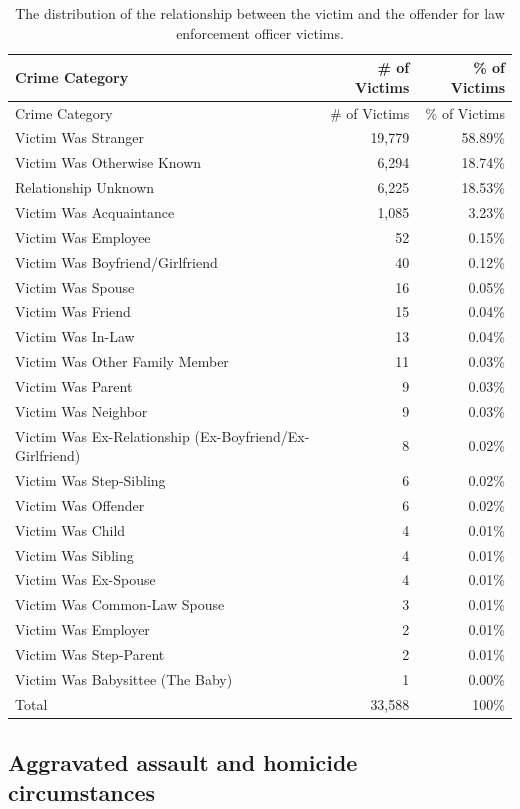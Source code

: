 \documentclass[
  12pt,
  openany]{book}
\begin{document}
\begin{longtable}[]{@{}lrr@{}}
\caption{\label{tab:victimRelationshipPolice}The distribution of the relationship between the victim and the offender for law enforcement officer victims.}\tabularnewline
\toprule
Crime Category & \# of Victims & \% of Victims\tabularnewline
\midrule
\endfirsthead
\toprule
Crime Category & \# of Victims & \% of Victims\tabularnewline
\midrule
\endhead
Victim Was Stranger & 19,779 & 58.89\%\tabularnewline
Victim Was Otherwise Known & 6,294 & 18.74\%\tabularnewline
Relationship Unknown & 6,225 & 18.53\%\tabularnewline
Victim Was Acquaintance & 1,085 & 3.23\%\tabularnewline
Victim Was Employee & 52 & 0.15\%\tabularnewline
Victim Was Boyfriend/Girlfriend & 40 & 0.12\%\tabularnewline
Victim Was Spouse & 16 & 0.05\%\tabularnewline
Victim Was Friend & 15 & 0.04\%\tabularnewline
Victim Was In-Law & 13 & 0.04\%\tabularnewline
Victim Was Other Family Member & 11 & 0.03\%\tabularnewline
Victim Was Parent & 9 & 0.03\%\tabularnewline
Victim Was Neighbor & 9 & 0.03\%\tabularnewline
Victim Was Ex-Relationship (Ex-Boyfriend/Ex-Girlfriend) & 8 & 0.02\%\tabularnewline
Victim Was Step-Sibling & 6 & 0.02\%\tabularnewline
Victim Was Offender & 6 & 0.02\%\tabularnewline
Victim Was Child & 4 & 0.01\%\tabularnewline
Victim Was Sibling & 4 & 0.01\%\tabularnewline
Victim Was Ex-Spouse & 4 & 0.01\%\tabularnewline
Victim Was Common-Law Spouse & 3 & 0.01\%\tabularnewline
Victim Was Employer & 2 & 0.01\%\tabularnewline
Victim Was Step-Parent & 2 & 0.01\%\tabularnewline
Victim Was Babysittee (The Baby) & 1 & 0.00\%\tabularnewline
Total & 33,588 & 100\%\tabularnewline
\bottomrule
\end{longtable}

\hypertarget{aggravated-assault-and-homicide-circumstances}{%
\subsection{Aggravated assault and homicide circumstances}\label{aggravated-assault-and-homicide-circumstances}}
\end{document}
